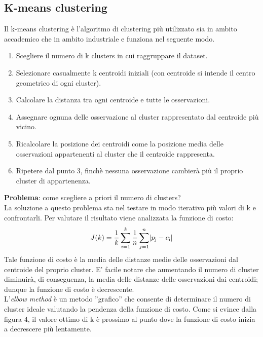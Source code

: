\documentclass[10pt,a4paper]{report}
\DeclarePairedDelimiter\abs{\lvert}{\rvert}
\begin{document}
        		\subsection{K-means clustering}
        		Il k-means clustering è l'algoritmo di clustering più utilizzato sia in ambito accademico che in ambito industriale e funziona nel seguente modo.
        		\begin{enumerate}
        		\item Scegliere il numero di k clusters in cui raggruppare il dataset.
        		\item Selezionare casualmente k centroidi iniziali (con centroide si intende il centro geometrico di ogni cluster).
        		\item Calcolare la distanza tra ogni centroide e tutte le osservazioni.
        		\item Assegnare ognuna delle osservazione al cluster rappresentato dal centroide più vicino.
        		\item Ricalcolare la posizione dei centroidi come la posizione media delle osservazioni appartenenti al cluster che il centroide rappresenta.
        		\item Ripetere dal punto 3, finchè nessuna osservazione cambierà più il proprio cluster di appartenenza.
        		\end{enumerate}
		\textbf{Problema}: come scegliere a priori il numero di clusters?\\
		La soluzione a questo problema sta nel testare in modo iterativo più valori di k e confrontarli. 
		Per valutare il risultato viene analizzata la funzione di costo:
		\[
		J(k)=\frac{1}{k}
		\sum_{i=1}^k
		\frac{1}{n}
		\sum_{j=1}^n
		\abs{p\textsubscript{j}-c\textsubscript{i}}
		\]
		Tale funzione di costo è la media delle distanze medie delle osservazioni dal centroide del proprio cluster. E' facile notare che aumentando il numero di
		cluster diminuirà, di conseguenza, la media delle distanze delle osservazioni dai centroidi; dunque la funzione di costo è decrescente.\\
		L'\textit{elbow method} è un metodo ''grafico'' che consente di determinare il numero di cluster ideale valutando la pendenza della funzione di costo.
		Come si evince dalla figura 4, il valore ottimo di k è prossimo al punto dove la funzione di costo inizia a decrescere più lentamente.
\end{document}
